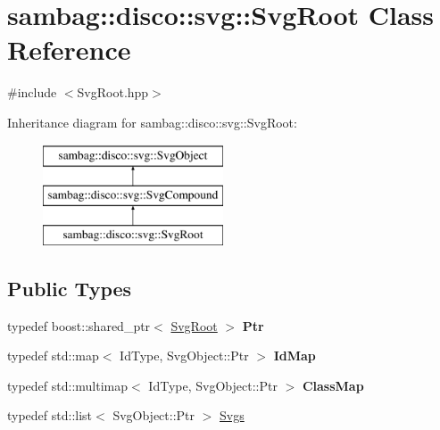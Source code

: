\hypertarget{classsambag_1_1disco_1_1svg_1_1_svg_root}{
\section{sambag::disco::svg::SvgRoot Class Reference}
\label{classsambag_1_1disco_1_1svg_1_1_svg_root}
}


{\ttfamily \#include $<$SvgRoot.hpp$>$}

Inheritance diagram for sambag::disco::svg::SvgRoot:\begin{figure}[H]
\begin{center}
\leavevmode
\includegraphics[height=3.000000cm]{classsambag_1_1disco_1_1svg_1_1_svg_root}
\end{center}
\end{figure}
\subsection*{Public Types}
\begin{DoxyCompactItemize}
\item 
\hypertarget{classsambag_1_1disco_1_1svg_1_1_svg_root_ad634cc2a6f9798fa68c99d6f0401adc9}{
typedef boost::shared\_\-ptr$<$ \hyperlink{classsambag_1_1disco_1_1svg_1_1_svg_root}{SvgRoot} $>$ {\bfseries Ptr}}
\label{classsambag_1_1disco_1_1svg_1_1_svg_root_ad634cc2a6f9798fa68c99d6f0401adc9}

\item 
\hypertarget{classsambag_1_1disco_1_1svg_1_1_svg_root_a99e19374ad6ef425342ccc9c7d58dde2}{
typedef std::map$<$ IdType, SvgObject::Ptr $>$ {\bfseries IdMap}}
\label{classsambag_1_1disco_1_1svg_1_1_svg_root_a99e19374ad6ef425342ccc9c7d58dde2}

\item 
\hypertarget{classsambag_1_1disco_1_1svg_1_1_svg_root_a406ec8c1f9cf1dd4199f495b87de58e0}{
typedef std::multimap$<$ IdType, SvgObject::Ptr $>$ {\bfseries ClassMap}}
\label{classsambag_1_1disco_1_1svg_1_1_svg_root_a406ec8c1f9cf1dd4199f495b87de58e0}

\item 
typedef std::list$<$ SvgObject::Ptr $>$ \hyperlink{classsambag_1_1disco_1_1svg_1_1_svg_root_a5c09e3b0f6e210ca6780d65e6802cc49}{Svgs}
\end{DoxyCompactItemize}
